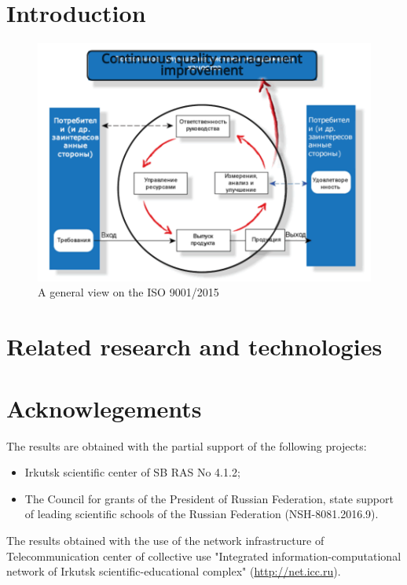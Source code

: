 \documentclass{llncs}
\begin{document}
\section{Introduction}
\label{sec:intro}

\begin{figure}[htb]
  \centering
  \includegraphics[width=0.8\linewidth]{qms-pics/iso9001.pdf}
  \caption{A general view on the ISO 9001/2015}
  \label{fig:iso9001}
\end{figure}

\section{Related research and technologies}
\label{sec:related}



\section{Acknowlegements}
\label{sec:acks}

The results are obtained with the partial support of the following projects:
\begin{itemize}
\item Irkutsk scientific center of SB RAS No 4.1.2;
\item The Council for grants of the President of Russian Federation, state support of leading scientific schools of the Russian Federation (NSH-8081.2016.9). %
\end{itemize}
The results obtained with the use of the network infrastructure of Telecommunication center of collective use "Integrated information-computational network of Irkutsk scientific-educational complex" (\url{http://net.icc.ru}).

\begin{thebibliography}{99}
\end{thebibliography}
\end{document}
